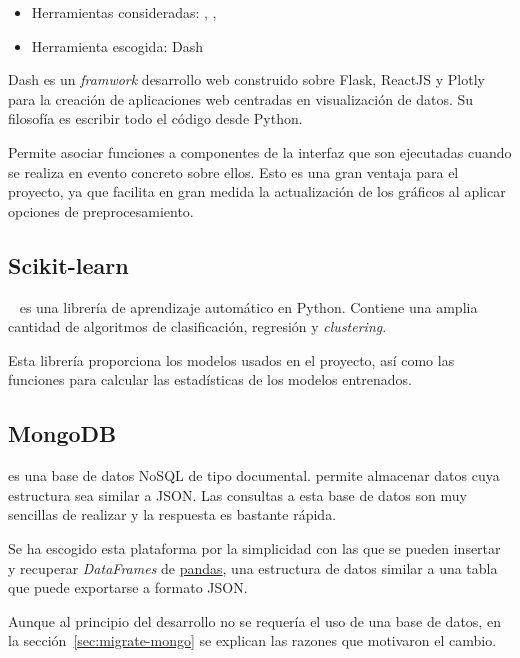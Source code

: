 \begin{itemize}
	\tightlist
	\item Herramientas consideradas: , , 
	\item Herramienta escogida: Dash
\end{itemize}

Dash es un \textit{framwork} desarrollo web construido sobre Flask, ReactJS y Plotly para la creación de aplicaciones web centradas en visualización de datos. Su filosofía es escribir todo el código desde Python.

Permite asociar funciones a componentes de la interfaz que son ejecutadas cuando se realiza en evento concreto sobre ellos. Esto es una gran ventaja para el proyecto, ya que facilita en gran medida la actualización de los gráficos al aplicar opciones de preprocesamiento.

\subsection{Scikit-learn}

~\cite{art:scikit-learn} es una librería de aprendizaje automático en Python. Contiene una amplia cantidad de algoritmos de clasificación, regresión y \textit{clustering}.

Esta librería proporciona los modelos usados en el proyecto, así como las funciones para calcular las estadísticas de los modelos entrenados.

\subsection{MongoDB}

 es una base de datos NoSQL de tipo documental. permite almacenar datos cuya estructura sea similar a JSON. Las consultas a esta base de datos son muy sencillas de realizar y la respuesta es bastante rápida.

Se ha escogido esta plataforma por la simplicidad con las que se pueden insertar y recuperar \textit{DataFrames} de \href{https://pandas.pydata.org/}{pandas}, una estructura de datos similar a una tabla que puede exportarse a formato JSON.

Aunque al principio del desarrollo no se requería el uso de una base de datos, en la sección~\ref{sec:migrate-mongo} se explican las razones que motivaron el cambio.

